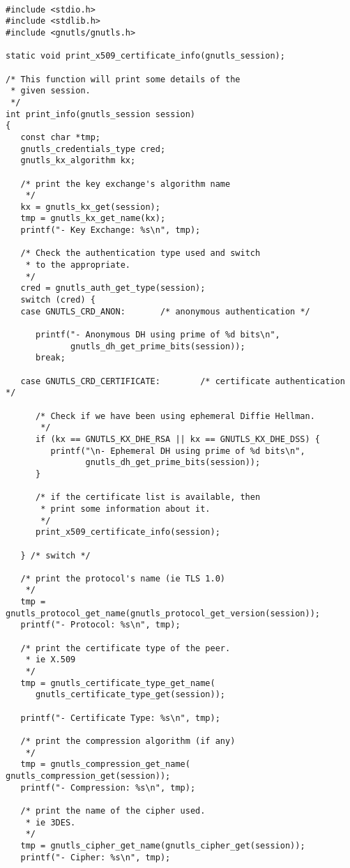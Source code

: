 \begin{verbatim}

#include <stdio.h>
#include <stdlib.h>
#include <gnutls/gnutls.h>

static void print_x509_certificate_info(gnutls_session);

/* This function will print some details of the
 * given session.
 */
int print_info(gnutls_session session)
{
   const char *tmp;
   gnutls_credentials_type cred;
   gnutls_kx_algorithm kx;

   /* print the key exchange's algorithm name
    */
   kx = gnutls_kx_get(session);
   tmp = gnutls_kx_get_name(kx);
   printf("- Key Exchange: %s\n", tmp);

   /* Check the authentication type used and switch
    * to the appropriate.
    */
   cred = gnutls_auth_get_type(session);
   switch (cred) {
   case GNUTLS_CRD_ANON:       /* anonymous authentication */

      printf("- Anonymous DH using prime of %d bits\n",
             gnutls_dh_get_prime_bits(session));
      break;

   case GNUTLS_CRD_CERTIFICATE:        /* certificate authentication */
      
      /* Check if we have been using ephemeral Diffie Hellman.
       */
      if (kx == GNUTLS_KX_DHE_RSA || kx == GNUTLS_KX_DHE_DSS) {
         printf("\n- Ephemeral DH using prime of %d bits\n",
                gnutls_dh_get_prime_bits(session));
      }

      /* if the certificate list is available, then
       * print some information about it.
       */
      print_x509_certificate_info(session);

   } /* switch */

   /* print the protocol's name (ie TLS 1.0) 
    */
   tmp = gnutls_protocol_get_name(gnutls_protocol_get_version(session));
   printf("- Protocol: %s\n", tmp);

   /* print the certificate type of the peer.
    * ie X.509
    */
   tmp = gnutls_certificate_type_get_name(
      gnutls_certificate_type_get(session));

   printf("- Certificate Type: %s\n", tmp);

   /* print the compression algorithm (if any)
    */
   tmp = gnutls_compression_get_name( gnutls_compression_get(session));
   printf("- Compression: %s\n", tmp);

   /* print the name of the cipher used.
    * ie 3DES.
    */
   tmp = gnutls_cipher_get_name(gnutls_cipher_get(session));
   printf("- Cipher: %s\n", tmp);


\end{verbatim}
